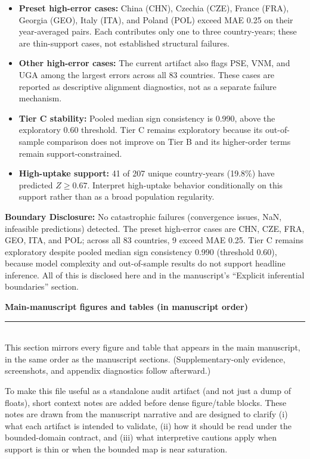 \documentclass[11pt]{article}
\newcommand{\SubRule}{\color{black}\rule{\linewidth}{0.4pt}}
\newcommand{\Section}[1]{\noindent\textbf{#1}\\[-0.25em]\SubRule\\[0.1em]}
\begin{document}
\begin{itemize}
\item {\small\textbf{Preset high-error cases:} China (CHN), Czechia (CZE), France (FRA), Georgia (GEO), Italy (ITA), and Poland (POL) exceed MAE 0.25 on their year-averaged pairs. Each contributes only one to three country-years; these are thin-support cases, not established structural failures.}
\item {\small\textbf{Other high-error cases:} The current artifact also flags PSE, VNM, and UGA among the largest errors across all 83 countries. These cases are reported as descriptive alignment diagnostics, not as a separate failure mechanism.}
\item {\small\textbf{Tier C stability:} Pooled median sign consistency is 0.990, above the exploratory 0.60 threshold. Tier C remains exploratory because its out-of-sample comparison does not improve on Tier B and its higher-order terms remain support-constrained.}
\item {\small\textbf{High-uptake support:} 41 of 207 unique country-years (19.8\%) have predicted $Z \ge 0.67$. Interpret high-uptake behavior conditionally on this support rather than as a broad population regularity.}
\end{itemize}

\noindent\textbf{Boundary Disclosure:} No catastrophic failures (convergence issues, NaN, infeasible predictions) detected. The preset high-error cases are CHN, CZE, FRA, GEO, ITA, and POL; across all 83 countries, 9 exceed MAE 0.25. Tier C remains exploratory despite pooled median sign consistency 0.990 (threshold 0.60), because model complexity and out-of-sample results do not support headline inference. All of this is disclosed here and in the manuscript's ``Explicit inferential boundaries'' section.

\Section{Main-manuscript figures and tables (in manuscript order)}
\noindent\justifying
This section mirrors every figure and table that appears in the main manuscript, in the same order as the manuscript
sections. (Supplementary-only evidence, screenshots, and appendix diagnostics follow afterward.)

\noindent\justifying
To make this file useful as a standalone audit artifact (and not just a dump of floats), short context notes are added
before dense figure/table blocks. These notes are drawn from the manuscript narrative and are designed to clarify
(i) what each artifact is intended to validate, (ii) how it should be read under the bounded-domain contract, and
(iii) what interpretive cautions apply when support is thin or when the bounded map is near saturation.
\end{document}
